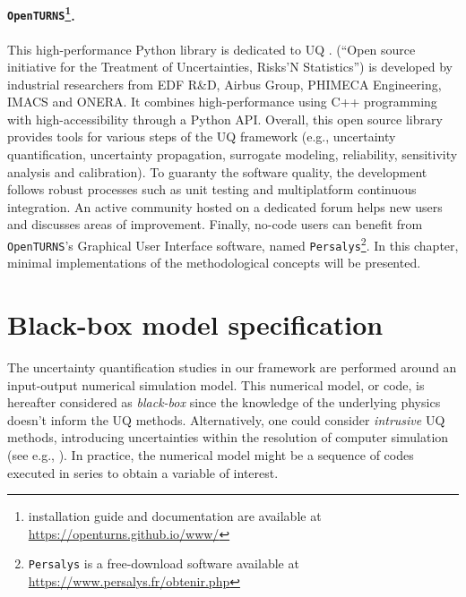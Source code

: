 \paragraph*{\textbf{\texttt{OpenTURNS}}\footnote{\ot installation guide and documentation are available at \url{https://openturns.github.io/www/}}.} 
This high-performance Python library is dedicated to UQ \citep{baudin_dutfoy_2017}. 
\ot (``Open source initiative for the Treatment of Uncertainties, Risks’N Statistics'') is developed by industrial researchers from  EDF R\&D, Airbus Group, PHIMECA Engineering, IMACS and ONERA.
It combines high-performance using C++ programming with high-accessibility through a Python API. 
Overall, this open source library provides tools for various steps of the UQ framework 
(e.g., uncertainty quantification, uncertainty propagation, surrogate modeling, reliability, sensitivity analysis and calibration). 
To guaranty the software quality, the development follows robust processes such as unit testing and multiplatform continuous integration. 
An active community hosted on a dedicated forum helps new users and discusses areas of improvement.
Finally, no-code users can benefit from \texttt{OpenTURNS}'s Graphical User Interface software, named \texttt{Persalys}\footnote{\texttt{Persalys} is a free-download software available at \url{https://www.persalys.fr/obtenir.php}}.
In this chapter, minimal \ot implementations of the methodological concepts will be presented. 



\section{Black-box model specification} \label{sec:model_spec}
The uncertainty quantification studies in our framework are performed around an input-output numerical simulation model. 
This numerical model, or code, is hereafter considered as \textit{black-box} since the knowledge of the underlying physics doesn't inform the UQ methods. 
Alternatively, one could consider \textit{intrusive} UQ methods, introducing uncertainties within the resolution of computer simulation (see e.g., \citet{lemaitre_2010}).
In practice, the numerical model might be a sequence of codes executed in series to obtain a variable of interest.

